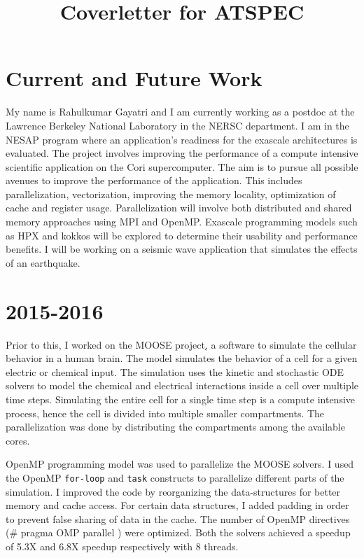\documentclass[margin]{res}
\title{Coverletter for ATSPEC}
\begin{document}
{\maketitle}

\section{Current and Future Work}
 My name is Rahulkumar Gayatri and I am currently working as a postdoc at the Lawrence Berkeley National Laboratory in the NERSC department.
 I am in the NESAP program where an application's readiness for the exascale architectures is evaluated.
 The project involves improving the performance of a compute intensive scientific application on the Cori supercomputer.
 The aim is to pursue all possible avenues to improve the performance of the application.
 This includes parallelization, vectorization, improving the memory locality, optimization of cache and register usage.
 Parallelization will involve both distributed and shared memory approaches using MPI and OpenMP.
 Exascale programming models such as HPX and kokkos will be explored to determine their usability and performance benefits.
 I will be working on a seismic wave application that simulates the effects of an earthquake.
\section{2015-2016}
 Prior to this, I worked on the MOOSE project\href{https://moose.ncbs.res.in/}, a software to simulate the cellular behavior in a human brain.
 The model simulates the behavior of a cell for a given electric or chemical input.
 The simulation uses the kinetic and stochastic ODE solvers to model the chemical and electrical interactions inside a cell over multiple time steps.
 Simulating the entire cell for a single time step is a compute intensive process, hence the cell is divided into multiple smaller compartments.
 The parallelization was done by distributing the compartments among the available cores.
%

 OpenMP programming model was used to parallelize the MOOSE solvers.
 I used the OpenMP \texttt{for-loop} and \texttt{task} constructs to parallelize different parts of the simulation.
 I improved the code by reorganizing the data-structures for better memory and cache access.
 For certain data structures, I added padding in order to prevent false sharing of data in the cache.
 The number of OpenMP directives (\# pragma OMP parallel ) were optimized.
 Both the solvers achieved a speedup of 5.3X and 6.8X speedup respectively with 8 threads.
%
\end{document}
